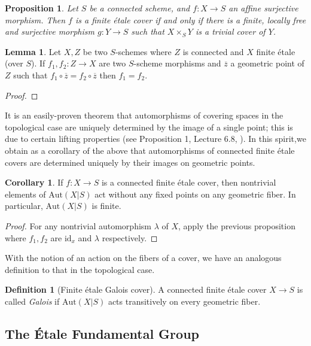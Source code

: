 \documentclass{article}
\theoremstyle{definition}
\newtheorem{lemma}[theorem]{Lemma}
\newtheorem{corollary}[theorem]{Corollary}
\newtheorem{definition}[theorem]{Definition}
\theoremstyle{remark}
\theoremstyle{plain}
\newtheorem{proposition}[theorem]{Proposition}
\begin{document}
\begin{proposition}
	Let $S$ be a connected scheme, and $f\colon X \to S$ an affine surjective morphism.
	Then $f$ is a finite \'etale cover if and only if there is a finite, locally free and surjective morphism $g: Y \to S$ such that $X \times_S Y$ is a trivial cover of $Y$.
\end{proposition}

\begin{lemma}
	Let $X, Z$ be two $S$-schemes where $Z$ is connected and $X$ finite \'etale (over $S$). 
	If $f_1, f_2: Z \to X$ are two $S$-scheme morphisms and $\overline{z}$ a geometric point of $Z$  such that $f_1 \circ \overline{z} = f_2 \circ \overline{z}$ then $f_1 = f_2$.
\end{lemma}

\begin{proof}
\end{proof}

It is an easily-proven theorem that automorphisms of covering spaces in the topological case are uniquely determined by the image of a single point; this is due to certain lifting properties (see Proposition 1, Lecture 6.8, \cite{FomenkoFuchs}).
In this spirit,we obtain as a corollary of the above that automorphisms of connected finite \'etale covers are determined uniquely by their images on geometric points.
\begin{corollary}
	If $f: X \to S$ is a connected finite \'etale cover, then nontrivial elements of $\text{Aut}(X|S)$ act without any fixed points on any geometric fiber.
	In particular, $\text{Aut}(X|S)$ is finite.
\end{corollary}

\begin{proof}
	For any nontrivial automorphism $\lambda$ of $X$, apply the previous proposition where $f_1, f_2$ are $\text{id}_x$ and $\lambda$ respectively.
\end{proof}

With the notion of an action on the fibers of a cover, we have an analogous definition to that in the topological case.

\begin{definition}[Finite \'etale Galois cover]
	A connected finite \'etale cover $X \to S$ is called \textit{Galois} if $\text{Aut}(X|S)$ acts transitively on every geometric fiber.
\end{definition}


\subsection{The \'Etale Fundamental Group}
\end{document}

